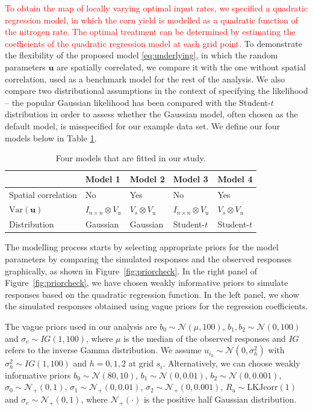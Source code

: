 \documentclass[a4paper]{article}   	%
\newcommand{\Var}{\mathrm{Var}}
\newcommand{\N}{\mathcal{N}}
\begin{document}
	\textcolor{red}{To obtain the map of locally varying optimal input rates, we specified a quadratic regression model, in which the corn yield is modelled as a quadratic function of the nitrogen rate. The optimal treatment can be determined by estimating the coefficients of the quadratic regression model at each grid point.} To demonstrate the flexibility of the proposed model \eqref{eq:underlying}, in which the random parameters $\bm{u}$ are spatially correlated, we compare it with the one without spatial correlation, used as a benchmark model for the rest of the analysis. We also compare two distributional assumptions in the context of specifying the likelihood -- the popular Gaussian likelihood has been compared with the Student-$t$ distribution in order to assess whether the  Gaussian model, often chosen as the default model, is misspecified for our example data set. We define our four models below in Table \ref{tb:models}. 
	
	
	\begin{table}[!htp]
		\centering
		\begin{tabular}{*{5}{l}} \toprule
			& Model 1 & Model 2& Model 3& Model 4  \\ \midrule
			Spatial correlation & No & Yes & No & Yes \\ 
			$\Var(\bm{u})$ &  $I_{n\times n}\otimes V_u$ & $V_s\otimes V_u$ & $I_{n\times n}\otimes V_u$ & $V_s\otimes V_u$ \\ 
			Distribution & Gaussian & Gaussian & Student-$t$ & Student-$t$ \\
			\bottomrule
		\end{tabular}\caption{Four models that are fitted in our study.}\label{tb:models}
	\end{table}
	
	
	The modelling process starts by selecting appropriate priors for the model parameters by comparing the simulated responses and the observed responses graphically, as shown in Figure~\ref{fig:priorcheck}. In the right panel of Figure~\ref{fig:priorcheck}, we have chosen weakly informative priors to simulate responses based on the quadratic regression function. In the left panel, we show the simulated responses obtained using vague priors for the regression coefficients.
	
	The vague priors used in our analysis are $b_0\sim \N(\mu,100)$, $b_1,b_2\sim \N(0,100)$ and $\sigma_e\sim IG(1,100)$, where $\mu$ is the median of the observed responses and $IG$ refers to the inverse Gamma distribution. We assume $u_{i_h}\sim \N(0,\sigma_{h}^2)$ with $\sigma_h^2\sim IG(1,100)$ and $h=0, 1, 2$ at grid $s_i$.  Alternatively, we can choose weakly informative priors $b_0\sim \N(80,10)$, $b_1\sim \N(0,0.01)$, $b_2\sim \N(0,0.001)$, $\sigma_{0}\sim \N_+(0,1)$, $\sigma_{1}\sim \N_+(0,0.01)$, $\sigma_{2}\sim \N_+(0,0.001)$, $R_u\sim \mbox{LKJcorr}(1)$ and $\sigma_e\sim \N_+(0,1)$, where $\N_+(\cdot)$ is the positive half Gaussian distribution. 
	
\end{document}
